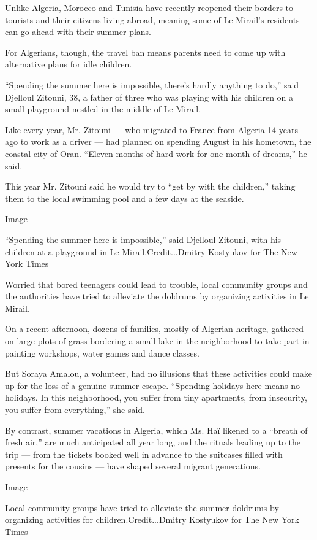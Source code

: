 Unlike Algeria, Morocco and Tunisia have recently reopened their borders
to tourists and their citizens living abroad, meaning some of Le
Mirail's residents can go ahead with their summer plans.

For Algerians, though, the travel ban means parents need to come up with
alternative plans for idle children.

``Spending the summer here is impossible, there's hardly anything to
do,'' said Djelloul Zitouni, 38, a father of three who was playing with
his children on a small playground nestled in the middle of Le Mirail.

Like every year, Mr. Zitouni --- who migrated to France from Algeria 14
years ago to work as a driver --- had planned on spending August in his
hometown, the coastal city of Oran. ``Eleven months of hard work for one
month of dreams,'' he said.

This year Mr. Zitouni said he would try to ``get by with the children,''
taking them to the local swimming pool and a few days at the seaside.

Image

``Spending the summer here is impossible,'' said Djelloul Zitouni, with
his children at a playground in Le Mirail.Credit...Dmitry Kostyukov for
The New York Times

Worried that bored teenagers could lead to trouble, local community
groups and the authorities have tried to alleviate the doldrums by
organizing activities in Le Mirail.

On a recent afternoon, dozens of families, mostly of Algerian heritage,
gathered on large plots of grass bordering a small lake in the
neighborhood to take part in painting workshops, water games and dance
classes.

But Soraya Amalou, a volunteer, had no illusions that these activities
could make up for the loss of a genuine summer escape. ``Spending
holidays here means no holidays. In this neighborhood, you suffer from
tiny apartments, from insecurity, you suffer from everything,'' she
said.

By contrast, summer vacations in Algeria, which Ms. Haï likened to a
``breath of fresh air,'' are much anticipated all year long, and the
rituals leading up to the trip --- from the tickets booked well in
advance to the suitcases filled with presents for the cousins --- have
shaped several migrant generations.

Image

Local community groups have tried to alleviate the summer doldrums by
organizing activities for children.Credit...Dmitry Kostyukov for The New
York Times

